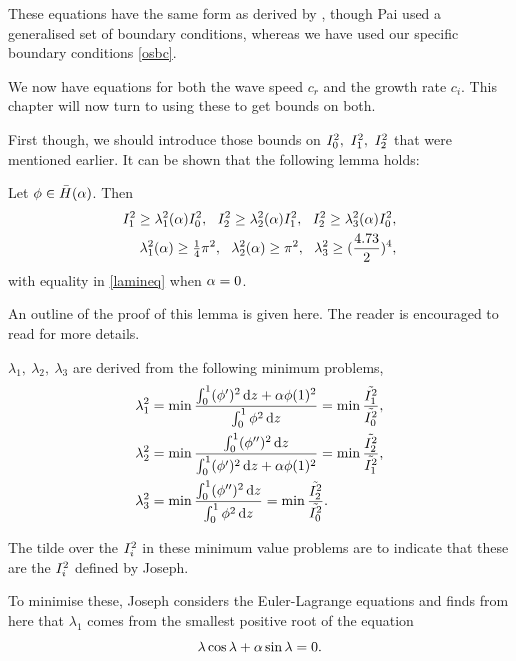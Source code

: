These equations have the same form as derived by \citet{pai1954generalization}, though Pai used a generalised set of boundary conditions, whereas we have used our specific boundary conditions \eqref{osbc}.

We now have equations for both the wave speed $ c_r $ and the growth rate $ c_i $. This chapter will now turn to using these to get bounds on both.

First though, we should introduce those bounds on $ I^2_{0},\ I^2_{1},\ I^2_{2} $ that were mentioned earlier. It can be shown that the following lemma holds:

\begin{lemma}
Let $ \phi \in \Bar{H}(\alpha) $. Then
\begin{subequations}
\begin{align}
    I^2_{1} \geq \lambda^2_1(\alpha) I^2_{0} ,\ \ I^2_{2} \geq \lambda^2_2(\alpha) I^2_{1},\ \ I^2_{2} \geq \lambda^2_3 (\alpha) I^2_{0}, \label{jineq1} \\ 
    \lambda^2_1(\alpha) \geq \tfrac{1}{4} \pi^2 ,\ \ \lambda^2_2(\alpha) \geq \pi^2, \ \ \lambda^2_3 \geq (\frac{4.73}{2})^4,  \label{jineq2}
\end{align}
\end{subequations}
with equality in \eqref{lamineq} when $ \alpha = 0 $.
\label{josephlemma}
\end{lemma}

\proof An outline of the proof of this lemma is given here. The reader is encouraged to read \citet{joseph1969eigenvalue} for more details. 

$ \lambda_1,\ \lambda_2,\ \lambda_3$ are derived from the following minimum problems,
\begin{align}
    \lambda_1^2 &= \min \frac{\int^{1}_{0} (\phi')^2 \dd{z} + \alpha \phi(1)^2}{\int^{1}_{0} \phi^2 \dd{z}} = \min \frac{\Tilde{I^2_{1}}}{\Tilde{I^2_{0}}}, \\
    \lambda_2^2 &= \min \frac{\int^{1}_{0} (\phi'')^2 \dd{z} }{\int^{1}_{0} (\phi')^2 \dd{z}  + \alpha \phi(1)^2} = \min \frac{\Tilde{I^2_{2}}}{\Tilde{I^2_{1}}}, \\
    \lambda_3^2 &= \min \frac{\int^{1}_{0} (\phi'')^2 \dd{z} }{\int^{1}_{0} \phi^2 \dd{z}} = \min 
 \frac{\Tilde{I^2_{2}}}{\Tilde{I^2_{0}}}.
 \label{minimumproblems}
\end{align}

The tilde over the $ I^2_{i}$ in these minimum value problems are to indicate that these are the $ I^2_{i}$ defined by Joseph.

To minimise these, Joseph considers the Euler-Lagrange equations and finds from here that $ \lambda_1 $ comes from the smallest positive root of the equation 
\begin{equation}
    \lambda \cos \lambda + \alpha \sin \lambda = 0.
\end{equation}


